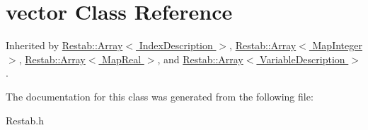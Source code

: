 \hypertarget{classstd_1_1vector}{
\section{vector Class Reference}
\label{classstd_1_1vector}
}


Inherited by \hyperlink{classRestab_1_1Array}{Restab::Array$<$ IndexDescription $>$}, \hyperlink{classRestab_1_1Array}{Restab::Array$<$ MapInteger $>$}, \hyperlink{classRestab_1_1Array}{Restab::Array$<$ MapReal $>$}, and \hyperlink{classRestab_1_1Array}{Restab::Array$<$ VariableDescription $>$}.

The documentation for this class was generated from the following file:\begin{DoxyCompactItemize}
\item 
Restab.h\end{DoxyCompactItemize}
